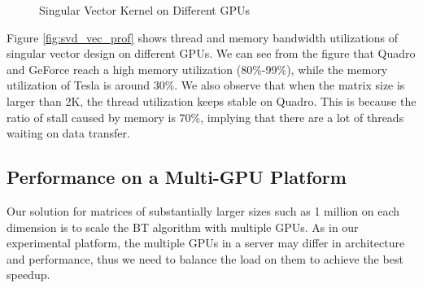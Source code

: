 \begin{figure}[hbpt]
\centering
  \caption{Singular Vector Kernel on Different GPUs}
  \label{fig:svd}
\vspace{-0.2in}
\end{figure}

Figure \ref{fig:svd_vec_prof} shows thread and memory bandwidth utilizations of singular vector design on different GPUs. 
We can see from the figure that Quadro and GeForce reach a high memory utilization (80\%-99\%), while the memory utilization of Tesla is around 30\%. 
We also observe that when the matrix size is larger than 2K, the thread utilization keeps stable on Quadro. 
This is because the ratio of stall caused by memory is 70\%, implying that there are a lot of threads waiting on data transfer.


\subsection{Performance on a Multi-GPU Platform}

Our solution for matrices of substantially larger sizes such
as 1 million on each dimension is to scale the BT algorithm
with multiple GPUs.
As in our experimental platform, the multiple GPUs in a server may differ
in architecture and performance, thus we need to balance the load on them
to achieve the best speedup.

